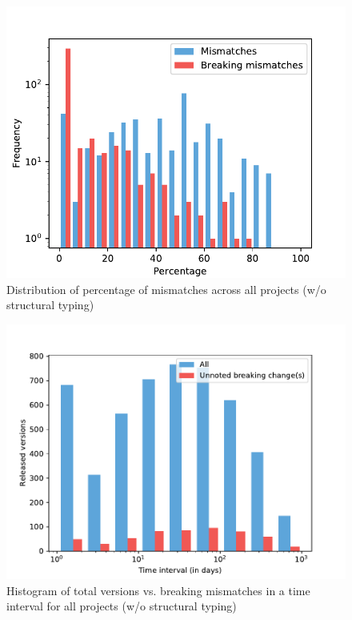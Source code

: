 \documentclass{l4proj}
\begin{document}
\begin{appendices}
\begin{figure}[]
\centering
\caption{Distribution of percentage of mismatches across all projects
(w/o structural typing)}
\label{DistributionAllProjects}
\includegraphics[height=0.4\textheight]
{images/evaluation/distribution_mismatches_all_projects}
\end{figure}

\begin{figure}[]
\centering
\caption{Histogram of total versions vs. breaking mismatches in a time
interval for all projects (w/o structural typing)}
\label{HistogramAllProjects}
\includegraphics[height=0.4\textheight]
{images/evaluation/ls_nonstr_introduced_changes}
\end{figure}


\end{appendices}
\end{document}
